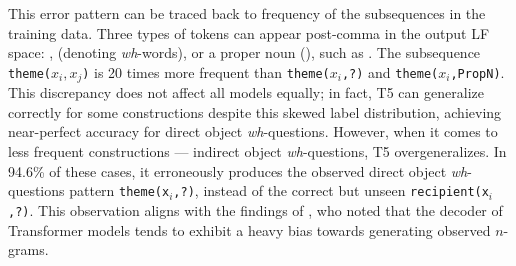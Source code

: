\noindent This error pattern can be traced back to frequency of the subsequences in the training data. Three types of tokens can appear post-comma in the output LF space: ,  (denoting \emph{wh}-words), or a proper noun (), such as . The subsequence \texttt{theme($x_i,x_j$)} is 20 times more frequent than \texttt{theme($x_i$,?)} and \texttt{theme($x_i$,PropN)}. This discrepancy does not affect all models equally; in fact, T5 can generalize correctly for some constructions despite this skewed label distribution, achieving near-perfect accuracy for direct object \emph{wh}-questions. However, when it comes to less frequent constructions --- indirect object \emph{wh}-questions, T5 overgeneralizes. In 94.6\% of these cases, it erroneously produces the observed direct object \emph{wh}-questions pattern \texttt{theme(x$_i$,?)}, instead of the correct but unseen \texttt{recipient(x$_i$,?)}. This observation aligns with the findings of \citet{wu2023recogs,yao-koller-2022-structural}, who noted that the decoder of Transformer models tends to exhibit a heavy bias towards generating observed $n$-grams.

